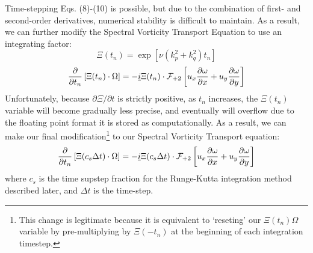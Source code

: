 \documentclass[12pt, reqno]{amsart}
\begin{document}
Time-stepping Eqs. (8)-(10) is possible, but due to the combination of first- and second-order derivatives, numerical stability is difficult to maintain. As a result, we can further modify the Spectral Vorticity Transport Equation to use an integrating factor:
\begin{equation}
    \Xi(t_n) = \exp \left[ \nu (k_p^2 + k_q^2) t_n \right]
\end{equation}
\begin{equation}
    \pdv{}{t_n} \left[ \Xi(t_n) \cdot \Omega \right] = - \underline{i} \Xi(t_n) \cdot \mathcal{F}_{+2} \left[ u_x \pdv{\omega}{x} + u_y \pdv{\omega}{y} \right]
\end{equation}
Unfortunately, because $\partial \Xi/\partial t$ is strictly positive, as $t_n$ increases, the $\Xi(t_n)$ variable will become gradually less precise, and eventually will overflow due to the floating point format it is stored as computationally. As a result, we can make our final modification\footnote{This change is legitimate because it is equivalent to `reseting' our $\Xi(t_n) \Omega$ variable by pre-multiplying by $\Xi(-t_n)$ at the beginning of each integration timestep.} to our Spectral Vorticity Transport equation:
\begin{equation}
    \pdv{}{t_n} \left[ \Xi(c_s \Delta t) \cdot \Omega \right] = - \underline{i} \Xi(c_s \Delta t) \cdot \mathcal{F}_{+2} \left[ u_x \pdv{\omega}{x} + u_y \pdv{\omega}{y} \right]
\end{equation}
where $c_s$ is the time supstep fraction for the Runge-Kutta integration method described later, and $\Delta t$ is the time-step.
\end{document}
